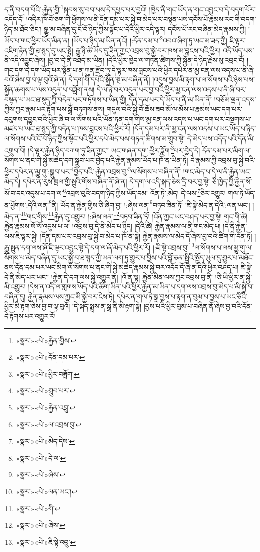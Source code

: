 ད་ནི་བདག་པོའི་:རྐྱེན་གྱི་\footnote{«སྣར་»«པེ་»རྐྱེན་གྱིས་}སྐབས་སུ་བབ་པས་དེ་དཔྱད་པར་བྱའོ། །ཁྱེད་ནི་གང་ཡོད་ན་གང་འབྱུང་བ་དེ་བདག་པོར་འདོད་དོ། །འདིར་ཁོ་བོ་ཅག་གི་ཕྱོགས་ལ་ནི་དོན་དམ་པར་སྐྱེ་བ་མེད་པར་བསྟན་པས་དངོས་པོ་རྣམས་རང་གི་བདག་ཉིད་མ་ཐོབ་ཅིང་། སྒྱུ་མ་བཞིན་དུ་ངོ་བོ་ཉིད་ཀྱིས་སྟོང་པ་དེའི་ཕྱིར་འདི་ལྟར། དངོས་པོ་རང་བཞིན་མེད་རྣམས་ཀྱི། །ཡོད་པ་གང་ཕྱིར་ཡོད་མིན་ན། །ཡོད་པ་ཉིད་མ་ཡིན་ནའོ། །:དོན་དམ་པ་\footnote{«སྣར་»«པེ་»དོན་དམ་པར་}འབའ་ཞིག་ཏུ་ཡང་མ་ཟད་ཀྱི། ཇི་ལྟར་འཇིག་རྟེན་གྱི་ཐ་སྙད་དུ་ཡང་སྟེ། རྒྱུ་ཉི་ཚེ་ཡོད་དུ་ཟིན་ཀྱང་འབྲས་བུ་སྐྱེ་བར་ཁས་མ་བླངས་པའི་ཕྱིར། འདི་ཡོད་པས་ནི་འདི་འབྱུང་ཞེས། །བྱ་བ་དེ་ནི་འཐད་མ་ཡིན། །དེའི་ཕྱིར་ཁྱེད་ལ་གཏན་ཚིགས་ཀྱི་སྐྱོན་དེ་ཉིད་རྗེས་སུ་འབྲང་ངོ། །གང་དག་དེ་དག་ཡོད་པར་སྟོན་པ་ན་ཀུན་རྫོབ་ཏུ་དེ་ལྟར་ཁས་བླངས་པའི་ཕྱིར་དཔེར་ན་མྱ་ངན་ལས་འདས་པ་ནི་ཞི་བའོ་ཞེས་བྱ་བ་ལྟ་བུའོ་ཞེ་ན། དེ་དག་གི་དཔེའི་སྐྱོན་སྔ་མ་བཞིན་ནོ། །འདུས་བྱས་མི་རྟག་པ་ལ་སོགས་པའི་ཉེས་པས་སྐྱོན་ཆགས་པ་ལས་འདུན་པ་བཟློག་ནས། དེ་ལ་ཉེ་བར་འདུན་པར་བྱ་བའི་ཕྱིར་མྱ་ངན་ལས་འདས་པ་ནི་ཞི་བར་བསྟན་པ་ཡང་ཐ་སྙད་ཀྱི་བདེན་པར་གཏོགས་པ་ཡིན་གྱི། དོན་དམ་པར་དེ་ཡོད་པ་ནི་མ་ཡིན་ནོ། །བཅོམ་ལྡན་འདས་ཀྱིས་ཀྱང་རྣམ་པར་རྟོག་པས་སྒྲོ་བཏགས་ནས། གདུལ་བའི་སྐྱེ་བོ་ཆོས་ཟབ་མོ་ལ་མོས་པ་རྣམས་ཡང་དག་པར་དབུགས་དབྱུང་བའི་ཕྱིར་ཞི་བ་ལ་སོགས་པའི་ཡོན་ཏན་དག་གིས་མྱ་ངན་ལས་འདས་པ་ཡང་དག་པར་བསྔགས་པ་མཛད་པ་ཡང་ཐ་སྙད་ཀྱི་བདེན་པ་ཁས་བླངས་པའི་ཕྱིར་རོ། །དོན་དམ་པར་ནི་མྱ་ངན་ལས་འདས་པ་ཡང་ཡོད་པ་ཉིད་ལ་སོགས་པའི་ངོ་བོ་ཉིད་ཀྱིས་སྟོང་པའི་ཕྱིར་དཔེ་མེད་པས་གཏན་ཚིགས་མ་གྲུབ་སྟེ། དེ་མེད་པས་འདོད་པའི་དོན་མི་འགྲུབ་བོ། །དེ་ལྟར་རྐྱེན་ཉིད་བཀག་ཏུ་ཟིན་ཀྱང་། ཡང་གཞན་དག་:ཕྱིར་ཟློག་\footnote{«སྣར་»«པེ་»ཕྱིར་བཟློག་}པར་བྱེད་དེ། དོན་དམ་པར་མིག་ལ་སོགས་པ་ནང་གི་སྐྱེ་མཆེད་དག་སྒྲུབ་པར་བྱེད་པའི་རྐྱེན་རྣམས་ཡོད་པ་ཁོ་ན་ཡིན་ཏེ། དེ་རྣམས་ཀྱི་འབྲས་བུ་སྐྱེ་བའི་ཕྱིར་དཔེར་ན་མྱུ་གུ་:སྒྲུབ་པར་\footnote{«སྣར་»«པེ་»གྲུབ་པར་}བྱེད་པའི་:རྐྱེན་འབྲས་བུ་\footnote{«སྣར་»«པེ་»རྐྱེན་འབྲུ་}ལ་སོགས་པ་བཞིན་ནོ། །གང་མེད་པ་དེ་ལ་ནི་རྐྱེན་ཡང་མེད་དེ། དཔེར་ན་རུས་སྦལ་གྱི་སྤུའི་གོས་བཞིན་ནོ་ཞེ་ན། དེ་དག་ལ་འདི་སྐད་ཅེས་དྲི་བར་བྱ་སྟེ། ཅི་ཁྱེད་ཀྱི་རྐྱེན་སོ་སོ་བ་དང་འདུས་པ་དག་ལ་\footnote{«སྣར་»«པེ་»ལ་འབྲས་བུ་}འབྲས་བུའི་བདག་ཉིད་ཀྱིས་ཡོད་དམ། འོན་ཏེ་:མེད། དེ་ལས་\footnote{«སྣར་»«པེ་»མེད།དེས་}ཅིར་འགྱུར། གལ་ཏེ་ཡོད་ན་ཕྱོགས་:དེའི་ལན་\footnote{«སྣར་»«པེ་»དེ་ལ་}ནི། ཡོད་ན་རྐྱེན་གྱིས་ཅི་ཞིག་བྱ། །:ཞེས་ལན་\footnote{«སྣར་»«པེ་»ཞེས་}བཏབ་ཟིན་ཏོ། །ཇི་སྟེ་མེད་ན་དེའི་:ལན་ཡང་། །མེད་ན་\footnote{«སྣར་»«པེ་»ལན་ཡང་།}གང་གིས་\footnote{«སྣར་»«པེ་»གི་}རྐྱེན་དུ་འགྱུར། །:ཞེས་ལན་\footnote{«སྣར་»«པེ་»ཞེས་}བཏབ་ཟིན་ཏོ། །འོན་ཀྱང་ཡང་བཤད་པར་བྱ་སྟེ། གང་གི་ཚེ། རྐྱེན་རྣམས་སོ་སོ་འདུས་པ་ལ། །འབྲས་བུ་དེ་ནི་མེད་པ་ཉིད། །དེའི་ཚེ། རྐྱེན་རྣམས་ལ་ནི་གང་མེད་པ། །དེ་ནི་རྐྱེན་ལས་ཇི་ལྟར་སྐྱེ། །དོན་དམ་པར་འབྲས་བུ་སྐྱེ་བ་མེད་པ་ཁོ་ན་སྟེ། རྐྱེན་རྣམས་ལ་མེད་དོ་ཞེས་བྱ་བའི་ཚིག་གི་དོན་ཏོ། །རྒྱུ་སྤུན་དག་ལས་ཞོ་ཇི་ལྟར་འབྱུང་སྟེ་དེ་དག་ལ་ཞོ་མེད་པའི་ཕྱིར་རོ། །:ཇི་སྟེ་འབྲས་བུ་\footnote{«སྣར་»«པེ་»ཇི་སྟེ་འབྲུ་}ལ་སོགས་པ་ལས་མྱུ་གུ་ལ་སོགས་པ་མེད་བཞིན་དུ་ཡང་སྐྱེ་བ་ཐ་སྙད་ཀྱི་ཡན་ལག་ཏུ་གྱུར་པ་བྱིས་པའི་བློ་ཅན་སྤྱིའི་སྤྱོད་ཡུལ་དུ་གྱུར་པ་མཐོང་ནས་དོན་དམ་པར་ཡང་མིག་ལ་སོགས་པ་ནང་གི་སྐྱེ་མཆེད་རྣམས་སྐྱེ་བར་འདོད་དོ་ཞེ་ན་དེའི་ཕྱིར་བཤད་པ། ཇི་སྟེ་དེ་ནི་མེད་པར་ཡང་། །རྐྱེན་དེ་དག་ལས་སྐྱེ་འགྱུར་ན། །འོ་ན་ལྟ། རྐྱེན་མིན་ལས་ཀྱང་འབྲས་བུ་ནི། །ཅི་ཡི་ཕྱིར་ན་སྐྱེ་མི་འགྱུར། །དེས་ན་འདི་ལ་གླགས་ཡོད་པའི་ཚིག་ཡིན་པའི་ཕྱིར་རྐྱེན་མ་ཡིན་པ་དག་ལས་འབྲས་བུ་མེད་པ་མི་སྐྱེ་བ་བཞིན་དུ། རྐྱེན་རྣམས་ལས་ཀྱང་མི་སྐྱེ་བར་ངེས་ཏེ། དཔེར་ན་གལ་ཏེ་སྒྲ་བྱས་པ་རྟག་ན་བུམ་པ་བྱས་པ་ཡང་ཅིའི་ཕྱིར་མི་རྟག་ཅེས་བྱ་བ་ལྟ་བུའོ། །དེ་སྐད་སྨྲས་ན་སྒྲ་ནི་མི་རྟག་སྟེ། །བྱས་པའི་ཕྱིར་བུམ་པ་བཞིན་ནོ་ཞེས་བྱ་བའི་དོན་དེ་རྟོགས་པར་འགྱུར་རོ། 